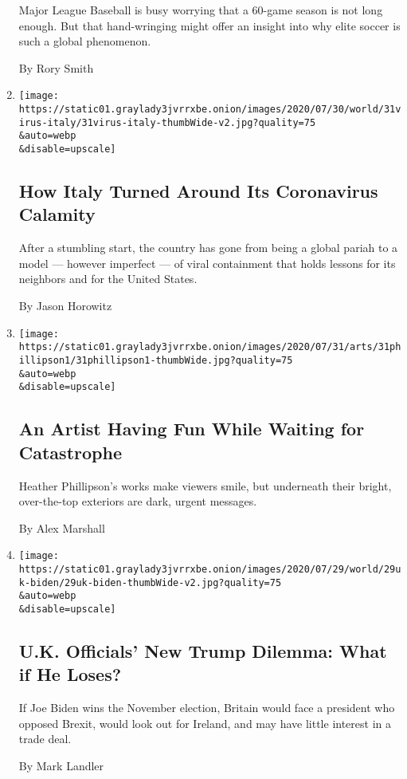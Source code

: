 \begin{enumerate}
  Major League Baseball is busy worrying that a 60-game season is not
  long enough. But that hand-wringing might offer an insight into why
  elite soccer is such a global phenomenon.

  By Rory Smith
\item
  \href{/2020/07/31/world/europe/italy-coronavirus-reopening.html}{}

  \texttt{[image: https://static01.graylady3jvrrxbe.onion/images/2020/07/30/world/31virus-italy/31virus-italy-thumbWide-v2.jpg?quality=75\\\&auto=webp\\\&disable=upscale]}

  \hypertarget{how-italy-turned-around-its-coronavirus-calamity}{%
  \subsection{How Italy Turned Around Its Coronavirus
  Calamity}\label{how-italy-turned-around-its-coronavirus-calamity}}

  After a stumbling start, the country has gone from being a global
  pariah to a model --- however imperfect --- of viral containment that
  holds lessons for its neighbors and for the United States.

  By Jason Horowitz
\item
  \href{/2020/07/31/arts/design/heather-phillipson-fourth-plinth.html}{}

  \texttt{[image: https://static01.graylady3jvrrxbe.onion/images/2020/07/31/arts/31phillipson1/31phillipson1-thumbWide.jpg?quality=75\\\&auto=webp\\\&disable=upscale]}

  \hypertarget{an-artist-having-fun-while-waiting-for-catastrophe}{%
  \subsection{An Artist Having Fun While Waiting for
  Catastrophe}\label{an-artist-having-fun-while-waiting-for-catastrophe}}

  Heather Phillipson's works make viewers smile, but underneath their
  bright, over-the-top exteriors are dark, urgent messages.

  By Alex Marshall
\item
  \href{/2020/07/31/world/europe/britain-biden-presidency-johnson.html}{}

  \texttt{[image: https://static01.graylady3jvrrxbe.onion/images/2020/07/29/world/29uk-biden/29uk-biden-thumbWide-v2.jpg?quality=75\\\&auto=webp\\\&disable=upscale]}

  \hypertarget{uk-officials-new-trump-dilemma-what-if-he-loses}{%
  \subsection{U.K. Officials' New Trump Dilemma: What if He
  Loses?}\label{uk-officials-new-trump-dilemma-what-if-he-loses}}

  If Joe Biden wins the November election, Britain would face a
  president who opposed Brexit, would look out for Ireland, and may have
  little interest in a trade deal.

  By Mark Landler
\end{enumerate}

